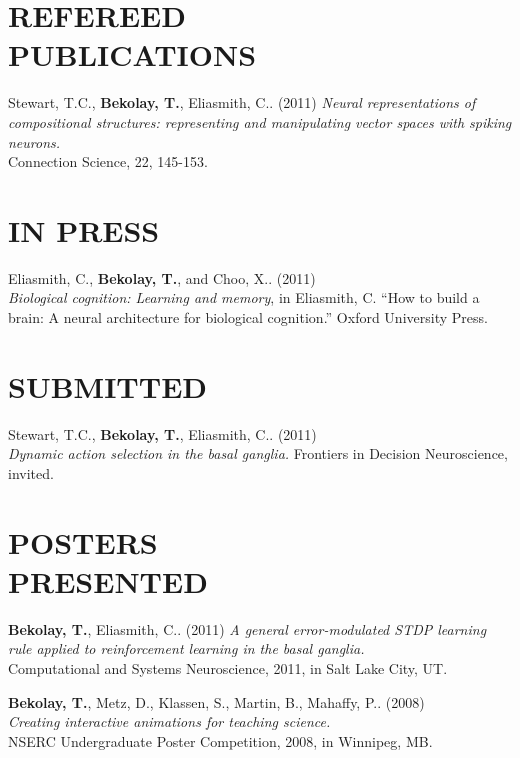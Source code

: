 \documentclass[line,margin]{res}
\begin{document}
\begin{resume}
\clearpage

\section{REFEREED \\PUBLICATIONS}
  Stewart, T.C., \textbf{Bekolay, T.}, Eliasmith, C.. (2011)
    {\sl Neural representations of compositional structures: representing and manipulating vector spaces with spiking neurons.} \\
    Connection Science, 22, 145-153.

\section{IN PRESS}
  Eliasmith, C., \textbf{Bekolay, T.}, and Choo, X.. (2011) \\
   {\sl Biological cognition: Learning and memory}, in Eliasmith, C. ``How to build a brain: A neural architecture for biological cognition.'' Oxford University Press.

\section{SUBMITTED}
  Stewart, T.C., \textbf{Bekolay, T.}, Eliasmith, C.. (2011) \\
    {\sl Dynamic action selection in the basal ganglia.}
    Frontiers in Decision Neuroscience, invited.



\section{POSTERS \\PRESENTED}
  \textbf{Bekolay, T.}, Eliasmith, C.. (2011)
    {\sl A general error-modulated STDP learning rule applied to reinforcement learning in the basal ganglia.} \\
    Computational and Systems Neuroscience, 2011, in Salt Lake City, UT.
  
  \textbf{Bekolay, T.}, Metz, D., Klassen, S., Martin, B., Mahaffy, P.. (2008) \\
    {\sl Creating interactive animations for teaching science.} \\
    NSERC Undergraduate Poster Competition, 2008, in Winnipeg, MB.


\end{resume}
\end{document}
